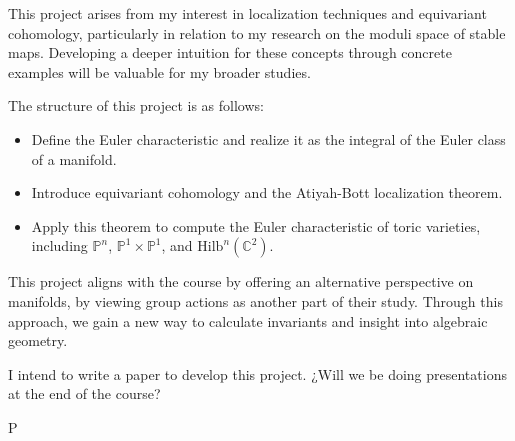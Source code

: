 \documentclass[12pt]{memoir}
\def\nextra {P}
\begin{document}
    This project arises from my interest in localization techniques and equivariant cohomology, particularly in relation to my research on the moduli space of stable maps. Developing a deeper intuition for these concepts through concrete examples will be valuable for my broader studies.
    
    The structure of this project is as follows:
    \begin{itemize}
        \item Define the Euler characteristic and realize it as the integral of the Euler class of a manifold.
        \item Introduce equivariant cohomology and the Atiyah-Bott localization theorem.
        \item Apply this theorem to compute the Euler characteristic of toric varieties, including $\mathbb{P}^n$, $\mathbb{P}^1 \times \mathbb{P}^1$, and $\text{Hilb}^n(\mathbb{C}^2)$.
    \end{itemize}
    
    This project aligns with the course by offering an alternative perspective on manifolds, by viewing group actions as another part of their study. Through this approach, we gain a new way to calculate invariants and insight into algebraic geometry.\par
    I intend to write a paper to develop this project. ¿Will we be doing presentations at the end of the course? 
    
    
\ifx\nextra\undefined
\printindex
\else\fi
\nocite{*}


\end{document}
